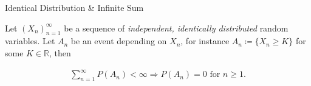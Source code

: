 \begin{observation}{}{Identical Distribution \& Infinite Sum}

    Let $(X_n)_{n=1}^{\infty}$ be a sequence of \emph{independent, identically distributed} random variables. Let $A_n$ be an event depending on $X_n$, for instance $A_n \coloneqq \{ X_n \geq K \}$ for some $K \in \mathbb{R}$, then 

        \begin{align*}
            \sum_{n=1}^{\infty} P(A_n) < \infty \Rightarrow P(A_n) = 0 \textrm{ for } n \geq 1.
        \end{align*}

\end{observation}
